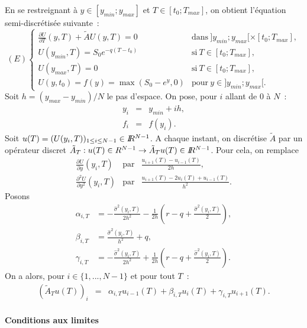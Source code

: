 En se restreignant \`a $y \in [y_{min};y_{max}]$ et 
$T \in [t_0;T_{max}]$, on obtient l'\'equation semi-discr\'etis\'ee 
suivante~: 
$$
(E)
\left \{
\begin{array}{ll}
\frac{\partial U}{\partial T}(y,T) + \tilde{A}U(y,T) = 0 & 
\text{dans}~ ]y_{min};y_{max}[ \times [t_0;T_{max}],\\
U(y_{min},T) = S_0e^{-q(T-t_0)} & 
\text{si}~ T \in [t_0;T_{max}],\\
U(y_{max},T) = 0 &  \text{si}~ T \in [t_0;T_{max}],\\ 
U(y,t_0) = f(y) = \max(S_0-e^y,0) & 
\text{pour}~ y \in ]y_{min};y_{max}[. 
\end{array}
\right .
$$
Soit $h=(y_{max}-y_{min})/N$ le pas d'espace. On pose, pour $i$ 
allant de $0$ \`a $N$~: 
\begin{eqnarray*}
y_i &=& y_{min} + ih,\\
f_i &=& f(y_i).
\end{eqnarray*}
Soit $u(T) = (U(y_i,T))_{1\leq i\leq N-1} \in I\!\! R^{N-1}$. A chaque 
instant, on discr\'etise $\tilde{A}$ par un op\'erateur discret 
$\tilde{A}_T:u(T) \in R^{N-1} \rightarrow \tilde{A}_Tu(T) 
\in I\!\! R^{N-1}$. Pour cela, on remplace
\begin{eqnarray*}
\frac{\partial U}{\partial y}(y_i,T) & \text{par} & 
\frac{u_{i+1}(T)-u_{i-1}(T)}{2h},\\
\frac{\partial^2 U}{\partial y^2}(y_i,T) & \text{par} & 
\frac{u_{i+1}(T)-2u_i(T)+u_{i-1}(T)}{h^2}.
\end{eqnarray*}
Posons 
\begin{align*}
\alpha_{i,T} &= -\frac{\hat{\sigma}^2(y_i,T)}{2h^2} - 
\frac{1}{2h}(r-q+\frac{\hat{\sigma}^2(y_i,T)}{2}),\\
\beta_{i,T} &= \frac{\hat{\sigma}^2(y_i,T)}{h^2} + q,\\
\gamma_{i,T} &= -\frac{\hat{\sigma}^2(y_i,T)}{2h^2} + 
\frac{1}{2h}(r-q+\frac{\hat{\sigma}^2(y_i,T)}{2}).
\end{align*}
On a alors, pour $i \in \{1,...,N-1\}$ et pour tout $T$~:
\begin{eqnarray*}
(\tilde{A}_T u(T))_i &=& \alpha_{i,T}u_{i-1}(T) + 
\beta_{i,T}u_i(T) + \gamma_{i,T}u_{i+1}(T).
\end{eqnarray*}

\paragraph{Conditions aux limites}

